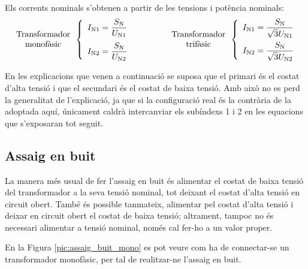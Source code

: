 Els corrents nominals s'obtenen a partir de les tensions i potència
nominals:
\begin{equation}
\begin{array}{c}\text{Transformador}\\
\text{monofàsic}
\end{array} \left\{
\begin{array}{l}
   I_\mathrm{N1} = \dfrac{S_\mathrm{N}}{U_\mathrm{N1}} \\[2.7ex]
   I_\mathrm{N2} = \dfrac{S_\mathrm{N}}{U_\mathrm{N2}}
\end{array}
\right. \qquad\qquad
\begin{array}{c}\text{Transformador}\\
\text{trifàsic}
\end{array} \left\{
\begin{array}{l}
   I_\mathrm{N1} = \dfrac{S_\mathrm{N}}{\sqrt{3}U_\mathrm{N1}} \\[2.5ex]
   I_\mathrm{N2} = \dfrac{S_\mathrm{N}}{\sqrt{3}U_\mathrm{N2}}
\end{array}
\right.
\end{equation}

En les explicacions que venen a continuació se suposa que el
primari és el costat d'alta tensió i que el secundari és el costat
de baixa tensió. Amb això no es perd la generalitat de
l'explicació, ja que si la configuració real és la contrària de la
adoptada aquí, únicament caldrà intercanviar els subíndexs 1 i 2 en
les equacions que s'exposaran tot seguit.

\subsection{Assaig en buit}

La manera més usual de fer l'assaig en buit és alimentar el costat
de baixa tensió del transformador a  la seva tensió nominal, tot
deixant el costat d'alta tensió en circuit obert. També és possible
tanmateix, alimentar pel costat d'alta tensió i deixar en circuit
obert el costat de baixa tensió; altrament, tampoc no és necessari
alimentar a tensió nominal, només cal fer-ho a un valor proper.

En la Figura \vref{pic:assaig_buit_mono} es pot veure com ha de
connectar-se un transformador monofàsic, per tal de realitzar-ne
l'assaig en buit.

\begin{center}
    
    \label{pic:assaig_buit_mono}
\end{center}

